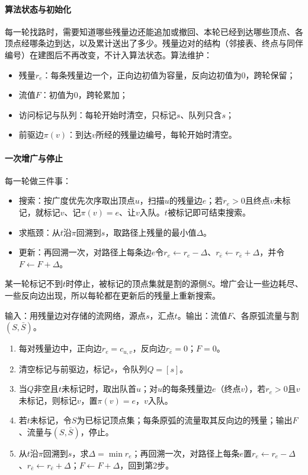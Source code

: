 \paragraph{算法状态与初始化}
每一轮找路时，需要知道哪些残量边还能追加或撤回、本轮已经到达哪些顶点、各顶点经哪条边到达，以及累计送出了多少。残量边对的结构（邻接表、终点与同伴编号）在建图后不再改变，不计入算法状态。算法维护：
\begin{itemize}
  \item 残量$r_e$：每条残量边一个，正向边初值为容量，反向边初值为$0$，跨轮保留；
  \item 流值$F$：初值为$0$，跨轮累加；
  \item 访问标记与队列：每轮开始时清空，只标记$s$、队列只含$s$；
  \item 前驱边$\pi(v)$：到达$v$所经的残量边编号，每轮开始时清空。
\end{itemize}

\paragraph{一次增广与停止}
每一轮做三件事：
\begin{itemize}
  \item 搜索：按广度优先次序取出顶点$u$，扫描$u$的残量边$e$；若$r_e>0$且终点$v$未标记，就标记$v$、记$\pi(v)=e$、让$v$入队。$t$被标记即可结束搜索。
  \item 求瓶颈：从$t$沿$\pi$回溯到$s$，取路径上残量的最小值$\Delta$。
  \item 更新：再回溯一次，对路径上每条边$e$令$r_e\gets r_e-\Delta$、$r_{\bar e}\gets r_{\bar e}+\Delta$，并令$F\gets F+\Delta$。
\end{itemize}
某一轮标记不到$t$时停止，被标记的顶点集就是割的源侧$S$。增广会让一些边耗尽、一些反向边出现，所以每轮都在更新后的残量上重新搜索。

\begin{algorithm}
\label{alg:graph-opt-edmonds-karp}
输入：用残量边对存储的流网络，源点$s$，汇点$t$。输出：流值$F$、各原弧流量与割$(S,\bar S)$。
\begin{enumerate}
  \item 每对残量边中，正向边$r_e=c_{u,v}$，反向边$r_{\bar e}=0$；$F=0$。
  \item 清空标记与前驱边，标记$s$，令队列$Q=[s]$。
  \item 当$Q$非空且$t$未标记时，取出队首$u$；对$u$的每条残量边$e$（终点$v$），若$r_e>0$且$v$未标记，则标记$v$，置$\pi(v)=e$，$v$入队。
  \item 若$t$未标记，令$S$为已标记顶点集；每条原弧的流量取其反向边的残量；输出$F$、流量与$(S,\bar S)$，停止。
  \item 从$t$沿$\pi$回溯到$s$，求$\Delta=\min r_e$；再回溯一次，对路径上每条$e$置$r_e\gets r_e-\Delta$、$r_{\bar e}\gets r_{\bar e}+\Delta$；$F\gets F+\Delta$，回到第2步。
\end{enumerate}
\end{algorithm}

